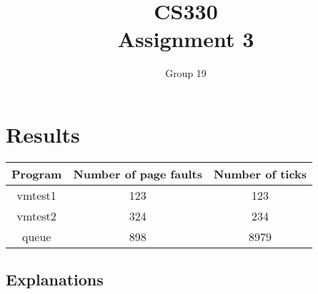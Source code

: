 \documentclass{article}
\author{Group 19}
\title{CS330 \\ Assignment 3}
\date{}
\begin{document}
\maketitle

\section{Results}
\begin{tabular}{| c | c | c |}
\hline
\textbf{Program} & \textbf{Number of page faults} & \textbf{Number of ticks}\\
\hline
vmtest1 & 123 & 123 \\
\hline
vmtest2 & 324 & 234 \\
\hline
queue & 898 & 8979 \\
\hline
\end{tabular}
\subsection{Explanations}
\end{document}
